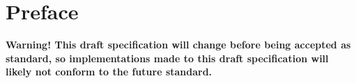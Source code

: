 \ifrelease
\else
    \chapter{Preface}

    {\bf Warning! This draft specification will change before being accepted as
    standard, so implementations made to this draft specification will likely not
    conform to the future standard.}
\fi
